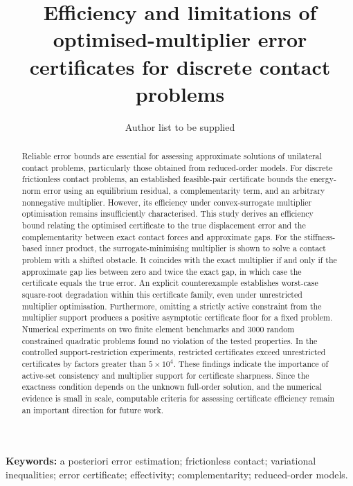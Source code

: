 \documentclass[11pt]{article}
\title{Efficiency and limitations of optimised-multiplier error certificates for discrete contact problems}
\author{Author list to be supplied}
\date{}
\theoremstyle{remark}
\begin{document}
\maketitle

\begin{abstract}
Reliable error bounds are essential for assessing approximate solutions of unilateral contact problems, particularly those obtained from reduced-order models. For discrete frictionless contact problems, an established feasible-pair certificate bounds the energy-norm error using an equilibrium residual, a complementarity term, and an arbitrary nonnegative multiplier. However, its efficiency under convex-surrogate multiplier optimisation remains insufficiently characterised. This study derives an efficiency bound relating the optimised certificate to the true displacement error and the complementarity between exact contact forces and approximate gaps. For the stiffness-based inner product, the surrogate-minimising multiplier is shown to solve a contact problem with a shifted obstacle. It coincides with the exact multiplier if and only if the approximate gap lies between zero and twice the exact gap, in which case the certificate equals the true error. An explicit counterexample establishes worst-case square-root degradation within this certificate family, even under unrestricted multiplier optimisation. Furthermore, omitting a strictly active constraint from the multiplier support produces a positive asymptotic certificate floor for a fixed problem. Numerical experiments on two finite element benchmarks and 3000 random constrained quadratic problems found no violation of the tested properties. In the controlled support-restriction experiments, restricted certificates exceed unrestricted certificates by factors greater than $5\times10^4$. These findings indicate the importance of active-set consistency and multiplier support for certificate sharpness. Since the exactness condition depends on the unknown full-order solution, and the numerical evidence is small in scale, computable criteria for assessing certificate efficiency remain an important direction for future work.
\end{abstract}

\noindent\textbf{Keywords:} a posteriori error estimation; frictionless contact; variational inequalities; error certificate; effectivity; complementarity; reduced-order models.












\end{document}
